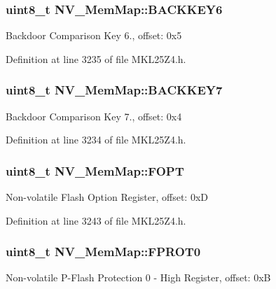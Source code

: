 \subsubsection[{\texorpdfstring{B\+A\+C\+K\+K\+E\+Y6}{BACKKEY6}}]{\setlength{\rightskip}{0pt plus 5cm}uint8\+\_\+t N\+V\+\_\+\+Mem\+Map\+::\+B\+A\+C\+K\+K\+E\+Y6}\hypertarget{struct_n_v___mem_map_aa2013cbf54568a1ed52cd6205b4b0b35}{}\label{struct_n_v___mem_map_aa2013cbf54568a1ed52cd6205b4b0b35}
Backdoor Comparison Key 6., offset\+: 0x5 

Definition at line 3235 of file M\+K\+L25\+Z4.\+h.

\subsubsection[{\texorpdfstring{B\+A\+C\+K\+K\+E\+Y7}{BACKKEY7}}]{\setlength{\rightskip}{0pt plus 5cm}uint8\+\_\+t N\+V\+\_\+\+Mem\+Map\+::\+B\+A\+C\+K\+K\+E\+Y7}\hypertarget{struct_n_v___mem_map_a398eb38f0e2b4a9da6562e42ed7a40b3}{}\label{struct_n_v___mem_map_a398eb38f0e2b4a9da6562e42ed7a40b3}
Backdoor Comparison Key 7., offset\+: 0x4 

Definition at line 3234 of file M\+K\+L25\+Z4.\+h.

\subsubsection[{\texorpdfstring{F\+O\+PT}{FOPT}}]{\setlength{\rightskip}{0pt plus 5cm}uint8\+\_\+t N\+V\+\_\+\+Mem\+Map\+::\+F\+O\+PT}\hypertarget{struct_n_v___mem_map_a3a3c0ec53723a865f6686bf4696800ba}{}\label{struct_n_v___mem_map_a3a3c0ec53723a865f6686bf4696800ba}
Non-\/volatile Flash Option Register, offset\+: 0xD 

Definition at line 3243 of file M\+K\+L25\+Z4.\+h.

\subsubsection[{\texorpdfstring{F\+P\+R\+O\+T0}{FPROT0}}]{\setlength{\rightskip}{0pt plus 5cm}uint8\+\_\+t N\+V\+\_\+\+Mem\+Map\+::\+F\+P\+R\+O\+T0}\hypertarget{struct_n_v___mem_map_a93d4a444c27eba9b9d8939e52440e8e8}{}\label{struct_n_v___mem_map_a93d4a444c27eba9b9d8939e52440e8e8}
Non-\/volatile P-\/\+Flash Protection 0 -\/ High Register, offset\+: 0xB 


